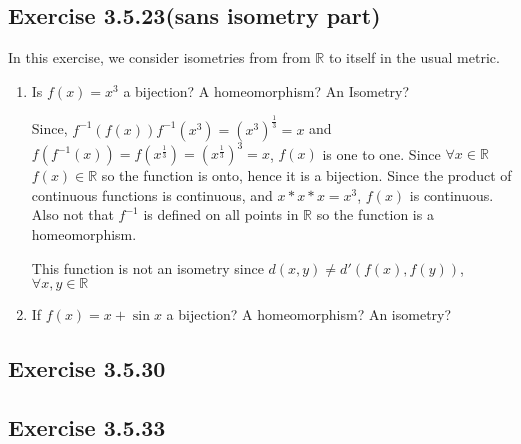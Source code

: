 \documentclass{tufte-book}
\theoremstyle{mytheoremstyle}
\theoremstyle{mylemstyle}
\theoremstyle{mydefstyle}
\begin{document}
\subsection{Exercise 3.5.23(sans isometry part)}
In  this exercise, we consider isometries from from $\mathbb{R}$ to itself in the usual metric.
\begin{enumerate}
\item Is $f(x) = x^3$ a bijection? A homeomorphism? An Isometry?

Since, $f^{-1}(f(x)) f^{-1}(x^3) = (x^3)^\frac{1}{3} = x$ and $f(f^{-1}(x))  = f(x^\frac{1}{3}) =(x^\frac{1}{3})^3 = x$, $f(x)$ is one to one.  Since $\forall x \in \mathbb{R}$ $f(x) \in \mathbb{R}$ so the function is onto, hence it is a bijection.   Since the product of continuous functions is continuous, and $x * x* x= x^3$, $f(x)$ is continuous.  Also not that $f^{-1}$ is defined on all points in $\mathbb{R}$ so the function is a homeomorphism. 

This function is not an isometry since $d(x,y) \neq d'(f(x), f(y))$, $\forall x,y \in \mathbb{R}$

\item If $f(x) = x + \sin x$ a bijection? A homeomorphism? An isometry?

\end{enumerate}

\subsection{Exercise 3.5.30}

\subsection{Exercise 3.5.33}
\end{document}
